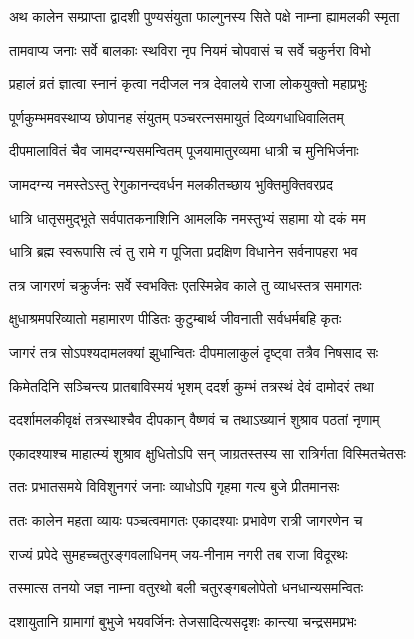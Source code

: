 \twolineshloka
{अथ कालेन सम्प्राप्ता द्वादशी पुण्यसंयुता}
{फाल्गुनस्य सिते पक्षे नाम्ना ह्यामलकी स्मृता} %

\twolineshloka
{तामवाप्य जनाः सर्वे बालकाः स्थविरा नृप}
{नियमं चोपवासं च सर्वे चकुर्नरा विभो} %

\twolineshloka
{प्रहालं व्रतं ज्ञात्वा स्नानं कृत्वा नदीजल}
{नत्र देवालये राजा लोकयुक्तो महाप्रभुः} %

\twolineshloka
{पूर्णकुम्भमवस्थाप्य छोपानह संयुतम्}
{पञ्चरत्नसमायुतं दिव्यगधाधिवालितम्} %

\twolineshloka
{दीपमालावितं चैव जामदग्न्यसमन्वितम्}
{पूजयामातुरव्यमा धात्री च मुनिभिर्जनाः} %

\twolineshloka
{जामदग्न्य नमस्तेऽस्तु रेगुकानन्दवर्धन}
{मलकीतच्छाय भुक्तिमुक्तिवरप्रद} %

\twolineshloka
{धात्रि धातृसमुद्भूते सर्वपातकनाशिनि}
{आमलकि नमस्तुभ्यं सहामा यो दकं मम} %

\twolineshloka
{धात्रि ब्रह्म स्वरूपासि त्वं तु रामे ग पूजिता}
{प्रदक्षिण विधानेन सर्वनापहरा भव} %

\twolineshloka
{तत्र जागरणं चक्रुर्जनः सर्वे स्वभक्तिः}
{एतस्मिन्नेव काले तु व्याधस्तत्र समागतः} %

\twolineshloka
{क्षुधाश्रमपरिव्यातो महामारण पीडितः}
{कुटुम्बार्थ जीवनाती सर्वधर्मबहि कृतः} %

\twolineshloka
{जागरं तत्र सोऽपश्यदामलक्यां झुधान्वितः}
{दीपमालाकुलं दृष्ट्वा तत्रैव निषसाद सः} %

\twolineshloka
{किमेतदिनि सञ्चिन्त्य प्रातबाविस्मयं भृशम्}
{ददर्श कुम्भं तत्रस्थं देवं दामोदरं तथा} %

\twolineshloka
{ददर्शामलकीवृक्षं तत्रस्थाश्चैव दीपकान्}
{वैष्णवं च तथाऽख्यानं शुश्राव पठतां नृणाम्} %

\twolineshloka
{एकादश्याश्च माहात्म्यं शुश्राव क्षुधितोऽपि सन्}
{जाग्रतस्तस्य सा रात्रिर्गता विस्मितचेतसः} %

\twolineshloka
{ततः प्रभातसमये विविशुनगरं जनाः}
{व्याधोऽपि गृहमा गत्य बुजे प्रीतमानसः} %

\twolineshloka
{ततः कालेन महता व्यायः पञ्चत्वमागतः}
{एकादश्याः प्रभावेण रात्री जागरणेन च} %

\twolineshloka
{राज्यं प्रपेदे सुमहच्चतुरङ्गवलाधिनम्}
{जय-नीनाम नगरी तब राजा विदूरथः} %

\twolineshloka
{तस्मात्स तनयो जज्ञ नाम्ना वतुरथो बली}
{चतुरङ्गबलोपेतो धनधान्यसमन्वितः} %

\twolineshloka
{दशायुतानि ग्रामागां बुभुजे भयवर्जिनः}
{तेजसादित्यसदृशः कान्त्या चन्द्रसमप्रभः} %

